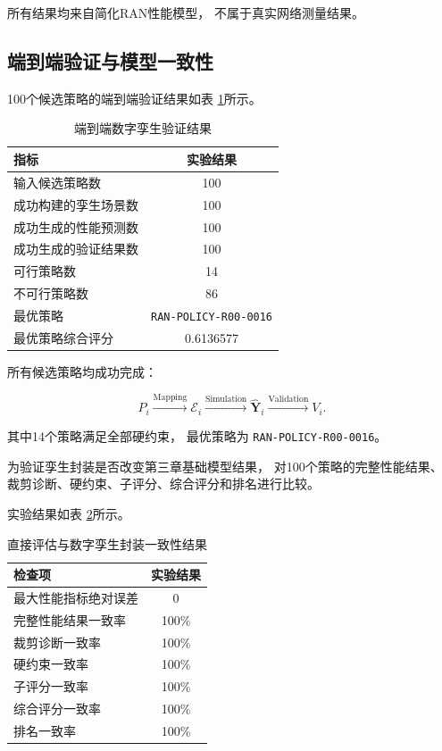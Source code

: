 \documentclass[lang=cn,12pt]{elegantbook}
\begin{document}
所有结果均来自简化RAN性能模型，
不属于真实网络测量结果。


\subsection*{端到端验证与模型一致性}

100个候选策略的端到端验证结果如表
\ref{tab:twin_end_to_end_results}所示。

\begin{table}[htbp]
    \centering
    \caption{端到端数字孪生验证结果}
    \label{tab:twin_end_to_end_results}
    \begin{tabular}{lc}
        \toprule
        指标 & 实验结果 \\
        \midrule
        输入候选策略数 & 100 \\
        成功构建的孪生场景数 & 100 \\
        成功生成的性能预测数 & 100 \\
        成功生成的验证结果数 & 100 \\
        可行策略数 & 14 \\
        不可行策略数 & 86 \\
        最优策略 & \texttt{RAN-POLICY-R00-0016} \\
        最优策略综合评分 & 0.6136577 \\
        \bottomrule
    \end{tabular}
\end{table}

所有候选策略均成功完成：

\begin{equation}
P_i
\xrightarrow{\mathrm{Mapping}}
\mathcal{E}_i
\xrightarrow{\mathrm{Simulation}}
\hat{\boldsymbol{Y}}_i
\xrightarrow{\mathrm{Validation}}
V_i.
\end{equation}

其中14个策略满足全部硬约束，
最优策略为
\texttt{RAN-POLICY-R00-0016}。

为验证孪生封装是否改变第三章基础模型结果，
对100个策略的完整性能结果、
裁剪诊断、硬约束、子评分、综合评分和排名进行比较。

实验结果如表
\ref{tab:twin_parity_results}所示。

\begin{table}[htbp]
    \centering
    \caption{直接评估与数字孪生封装一致性结果}
    \label{tab:twin_parity_results}
    \begin{tabular}{lc}
        \toprule
        检查项 & 实验结果 \\
        \midrule
        最大性能指标绝对误差 & 0 \\
        完整性能结果一致率 & 100\% \\
        裁剪诊断一致率 & 100\% \\
        硬约束一致率 & 100\% \\
        子评分一致率 & 100\% \\
        综合评分一致率 & 100\% \\
        排名一致率 & 100\% \\
        \bottomrule
    \end{tabular}
\end{table}
\end{document}
